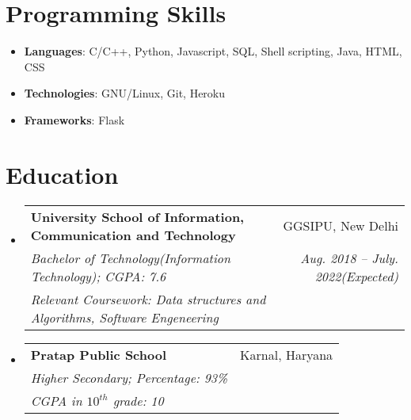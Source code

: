 \documentclass[letterpaper,11pt]{article}
\makeatletter
\newcommand{\resumeSubheading}[6]{
  \vspace{-1pt}\item
    \begin{tabular*}{0.97\textwidth}[t]{l@{\extracolsep{\fill}}r}
      \textbf{#1} & #2 \\
      \textit{\small#3} & \textit{\small #4} \\
       {#5} & #6\\
    \end{tabular*}\vspace{-5pt}
}
\newcommand{\resumeSubHeadingListStart}{\begin{itemize}[leftmargin=*]}
\newcommand{\resumeSubHeadingListEnd}{\end{itemize}}
\makeatother
\begin{document}
\section{Programming Skills}
  \resumeSubHeadingListStart
    \item{
      \textbf{Languages}{: C/C++, Python, Javascript, SQL, Shell scripting, Java, HTML, CSS}}
    \item{
      \textbf{Technologies}{: GNU/Linux, Git, Heroku}}
    \item{
      \textbf{Frameworks}{: Flask}}
  
  \resumeSubHeadingListEnd


\section{Education}
  \resumeSubHeadingListStart
    \resumeSubheading
      {University School of Information, Communication and Technology}{GGSIPU, New Delhi}
      {Bachelor of Technology(Information Technology);  CGPA: 7.6}{Aug. 2018 -- July. 2022(Expected)}
      {\textit{Relevant Coursework: Data structures and Algorithms, Software Engeneering}}{}
    \resumeSubheading
      {Pratap Public School}{Karnal, Haryana}
      {Higher Secondary; Percentage: 93\%}{}
      {\textit{CGPA in $10^{th}$ grade: 10}}{}
  \resumeSubHeadingListEnd





\end{document}
